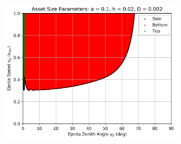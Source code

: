 \documentclass{article}
\begin{document}
\begin{figure}
\begin{subfigure}[t]{.32\textwidth}
	\end{subfigure}
	\begin{subfigure}[t]{.32\textwidth}
		\centering
		\includegraphics[width=.98\linewidth]{asset_speed_zenith_plot_1.100e+00_1.000e-01_2.000e-02_2.000e-03.png}  
		\label{fig:sub-asset_speed_zenith_h2_3}
	\end{subfigure}
	
	

\end{figure}
\end{document}
